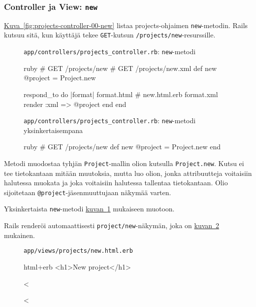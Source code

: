 \documentclass{article}
\newenvironment{myfigure}[1][tbp]{
  \begin{figure}[#1]
    \centering
    \begin{lrbox}{\myfigurebox}
      \begin{minipage}{\textwidth}
}{
      \end{minipage}
    \end{lrbox}
    \colorbox{blue!4}{\usebox{\myfigurebox}}
  \end{figure}
}
\newcommand{\myref}[2]{\hyperref[#2]{#1~\ref*{#2}}}
\newcommand{\pdfforeignlanguage}[2]{\texorpdfstring{\foreignlanguage{#1}{#2}}{#2}}
\newcommand{\eng}[1]{\pdfforeignlanguage{english}{#1}}
\begin{document}
\subsubsection{\eng{Controller} ja \eng{View}: \texttt{new}}
\label{sec:projects-controller-00-new}

\begin{samepage}
\myref{Kuva}{fig:projects-controller-00-new} listaa projects-ohjaimen
\texttt{new}-metodin. Rails kutsuu sitä, kun käyttäjä tekee \texttt{GET}-kutsun
\texttt{/projects/new}-resurssille.

\begin{myfigure}[H]
\caption{\texttt{app/controllers/projects\_controller.rb}: \texttt{new}-metodi}
\label{fig:projects-controller-00-new}

\begin{pygmented}{ruby}
  # GET /projects/new
  # GET /projects/new.xml
  def new
    @project = Project.new

    respond_to do |format|
      format.html # new.html.erb
      format.xml  { render :xml => @project }
    end
  end
\end{pygmented}

\caption{\texttt{app/controllers/projects\_controller.rb}: \texttt{new}-metodi
yksinkertaisempana}
\label{fig:projects-controller-01-new}

\begin{pygmented}{ruby}
  # GET /projects/new
  def new
    @project = Project.new
  end
\end{pygmented}
\end{myfigure}
\end{samepage}

Metodi muodostaa tyhjän \texttt{Project}-mallin olion kutsulla
\texttt{Project.new}. Kutsu ei tee tietokantaan mitään muutoksia, mutta luo
olion, jonka attribuutteja voitaisiin halutessa muokata ja joka voitaisiin
halutessa tallentaa tietokantaan. Olio sijoitetaan
\texttt{@project}-jäsenmuuttujaan näkymää varten.

Yksinkertaista \texttt{new}-metodi
\myref{kuvan}{fig:projects-controller-01-new} mukaiseen muotoon.

\begin{samepage}
Rails renderöi automaattisesti \texttt{project/new}-näkymän, joka on
\myref{kuvan}{fig:projects-new-view-00} mukainen.

\begin{myfigure}[H]
\caption{\texttt{app/views/projects/new.html.erb}}
\label{fig:projects-new-view-00}

\begin{pygmented}{html+erb}
<h1>New project</h1>

<%

<%
\end{pygmented}
\end{myfigure}
\end{samepage}
\end{document}
